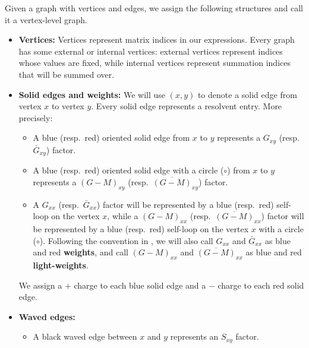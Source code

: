 \begin{definition}[Graphs] \label{def_graph1} 
Given a graph with vertices and edges, we assign the following structures and call it a vertex-level graph.  
\begin{itemize}
\item {\bf Vertices:} Vertices represent matrix indices in our expressions. Every graph has some external or internal vertices: external vertices represent indices whose values are fixed, while internal vertices represent summation indices that will be summed over. 
				
\item{\bf  Solid edges and weights:} We will use $(x,y)$ to denote a solid edge from vertex $x$ to vertex $y$. Every solid edge represents a resolvent entry. More precisely: 
\begin{itemize}
\item A blue (resp.~red) oriented solid edge from $x$ to $y$ represents a $G_{xy}$ (resp.~$\bar G_{xy}$) factor. 
    
\item A blue (resp.~red) oriented solid edge with a circle ($\circ$) from $x$ to $y$ represents a $(G-M)_{xy}$ (resp.~$\overline {(G-M)}_{xy} $) factor.

\item A $G_{xx}$ (resp.~$\bar G_{xx}$) factor will be represented by a blue (resp.~red) self-loop on the vertex $x$, while a $(G-M)_{xx}$ (resp.~$\overline {(G-M)}_{xx}$) factor will be represented by a blue (resp.~red) self-loop on the vertex $x$ with a circle ($\circ$). Following the convention in \cite{yang2021delocalization}, we will also call $G_{xx}$ and $\bar G_{xx}$ as blue and red {\bf weights}, and call $(G-M)_{xx}$ and $\overline {(G-M)}_{xx}$ as blue and red {\bf light-weights}.


\end{itemize}
We assign a $+$ charge to each blue solid edge and a $-$ charge to each red solid edge.		
\item {\bf Waved edges:}
\begin{itemize}
\item A black waved edge between $x$ and $y$ represents an $S_{xy}$ factor. 
				

\end{itemize}
\end{itemize}
\end{definition}
